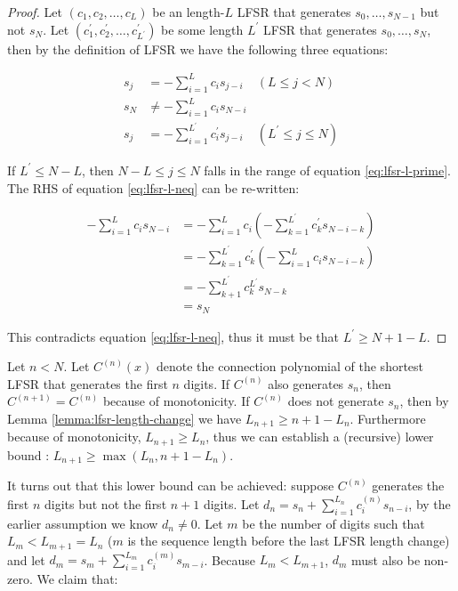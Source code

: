 \documentclass[runningheads]{llncs}
\begin{document}
\begin{proof}
    Let $(c_1, c_2, \ldots, c_L)$ be an length-$L$ LFSR that generates $s_0, \ldots, s_{N-1}$ but not $s_N$. Let $(c_1^\prime, c_2^\prime, \ldots, c_{L^\prime}^\prime)$ be some length $L^\prime$ LFSR that generates $s_0, \ldots, s_N$, then by the definition of LFSR we have the following three equations:

    \begin{align}
        s_j &= -\sum_{i=1}^Lc_is_{j-i} & (L \leq j < N) \label{eq:lfsr-l-1}\\
        s_N &\neq -\sum_{i=1}^Lc_is_{N-i} \label{eq:lfsr-l-neq}\\
        s_j &= -\sum_{i=1}^{L^\prime}c_i^\prime s_{j-i} & (L^\prime \leq j \leq N) \label{eq:lfsr-l-prime}
    \end{align}

    If $L^\prime \leq N - L$, then $N-L \leq j \leq N$ falls in the range of equation \ref{eq:lfsr-l-prime}. The RHS of equation \ref{eq:lfsr-l-neq} can be re-written:

    \begin{equation*}\begin{aligned}
        -\sum_{i=1}^Lc_is_{N-i} &= -\sum_{i=1}^Lc_i (-\sum_{k=1}^{L^\prime} c_k^\prime s_{N-i-k}) \\
        &= -\sum_{k=1}^{L^\prime} c_k^\prime (-\sum_{i=1}^Lc_i s_{N-i-k}) \\
        &= -\sum_{k+1}^{L^\prime}c_k^{L^\prime} s_{N-k} \\
        &= s_N
    \end{aligned}\end{equation*}

    This contradicts equation \ref{eq:lfsr-l-neq}, thus it must be that $L^\prime \geq N + 1 - L$.
\end{proof}

Let $n < N$. Let $C^{(n)}(x)$ denote the connection polynomial of the shortest LFSR that generates the first $n$ digits. If $C^{(n)}$ also generates $s_n$, then $C^{(n+1)} = C^{(n)}$ because of monotonicity. If $C^{(n)}$ does not generate $s_n$, then by Lemma \ref{lemma:lfsr-length-change} we have $L_{n+1} \geq n + 1 - L_n$. Furthermore because of monotonicity, $L_{n+1} \geq L_n$, thus we can establish a (recursive) lower bound : $L_{n+1} \geq \max(L_n, n + 1 - L_n)$.

It turns out that this lower bound can be achieved: suppose $C^{(n)}$ generates the first $n$ digits but not the first $n+1$ digits. Let $d_n = s_n + \sum_{i=1}^{L_n}c_i^{(n)}s_{n-i}$, by the earlier assumption we know $d_n \neq 0$. Let $m$ be the number of digits such that $L_m < L_{m+1} = L_n$ ($m$ is the sequence length before the last LFSR length change) and let $d_m = s_m + \sum_{i=1}^{L_m}c_i^{(m)}s_{m - i}$. Because $L_m < L_{m+1}$, $d_m$ must also be non-zero. We claim that:
\end{document}
